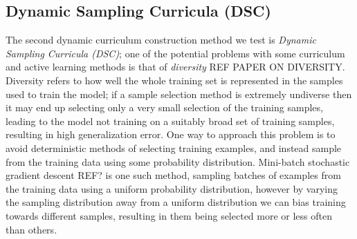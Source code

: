 \subsection{Dynamic Sampling Curricula (DSC)}
The second dynamic curriculum construction method we test is \textit{Dynamic Sampling Curricula (DSC)}; one of the potential problems with some curriculum and active learning methods is that of \textit{diversity} REF PAPER ON DIVERSITY. Diversity refers to how well the whole training set is represented in the samples used to train the model; if a sample selection method is extremely undiverse then it may end up selecting only a very small selection of the training samples, leading to the model not training on a suitably broad set of training samples, resulting in high generalization error. One way to approach this problem is to avoid deterministic methods of selecting training examples, and instead sample from the training data using some probability distribution. Mini-batch stochastic gradient descent REF? is one such method, sampling batches of examples from the training data using a uniform probability distribution, however by varying the sampling distribution away from a uniform distribution we can bias training towards different samples, resulting in them being selected more or less often than others. 

